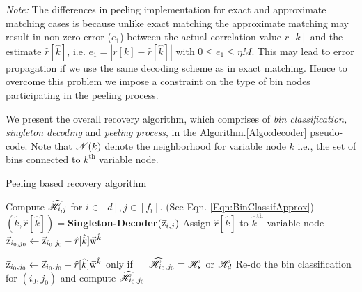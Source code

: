 {\it Note:} The differences in peeling implementation for exact and approximate matching cases is because unlike exact matching the approximate matching may result in non-zero error ($e_1$) between the actual correlation value $r[k]$ and the estimate $\hat{r}[\hat{k}]$, i.e. $e_1 = |r[k]- \hat{r}[\hat{k}]|$ with $0 \leq e_1 \leq \eta M$. This may lead to error propagation if we use the same decoding scheme as in exact matching. Hence to overcome this problem we impose a constraint on the type of bin nodes participating in the peeling process.
	
We present the overall recovery algorithm, which comprises of {\it bin classification, singleton decoding} and {\it peeling process}, in the Algorithm.\ref{Algo:decoder} pseudo-code. Note that $\mathscr{N}(k)$ denote the neighborhood for variable node $k$  i.e., the set of bins connected to $k^{\text{th}}$ variable node.

\def\gap{4pt}
\begin{algorithm}[h!]
\caption{Peeling based recovery algorithm}
\label{Algo:decoder}
\begin{algorithmic}
\State Compute $\widehat{\mathscr{H}}_{i,j}$ for $i\in[d], j\in[f_i]$. (See Eqn. \eqref{Eqn:BinClassifApprox})
\vspace{\gap}
\vspace{\gap}
  \State $(\hat{k},\hat{r}[\hat{k}])=${\bf Singleton-Decoder}$(\vec{\mathrm{z}}_{i,j})$
\vspace{\gap}
  \State Assign $\hat{r}[\hat{k}]$ to $\hat{k}^{\text{th}}$ variable node
\vspace{1.5\gap}
\vspace{\gap}
	   \State $\vec{\mathrm{z}}_{i_0,j_0}\gets\vec{\mathrm{z}}_{i_0,j_0}-\hat{r}[\hat{k}]\vec{\mathrm{w}}^{\hat{k}}\hspace{5.5ex} $ \hspace{20.5ex} 
	   \vspace{\gap}
        \Else
         
        \State $\vec{\mathrm{z}}_{i_0,j_0}\gets\vec{\mathrm{z}}_{i_0,j_0}-\hat{r}[\hat{k}]\vec{\mathrm{w}}^{\hat{k}}$   \hspace{2ex} only if $~~~~\widehat{\mathscr{H}}_{i_0,j_0}=\mathscr{H}_s$ or $\mathscr{H}_d$ 	   
        \hspace{14ex} 
        \EndIf
	   \vspace{\gap}
	   \State Re-do the bin classification for $(i_0,j_0)$ and compute $\widehat{\mathscr{H}}_{i_0,j_0}$
      \EndFor
\EndWhile
\end{algorithmic}
\end{algorithm}

